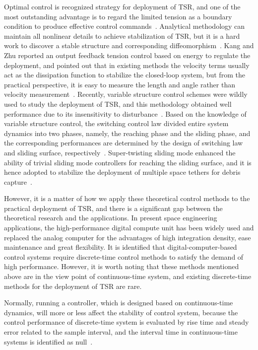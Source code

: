 \documentclass[10pt,final,journal]{IEEEtran}
\begin{document}
Optimal control  is recognized strategy for deployment of TSR, and one of the most outstanding advantage is to regard the limited tension as a boundary condition to produce effective control commands~\cite{williams2008deployment,wen2008optimal}. 
Analytical methodology can maintain all nonlinear details to achieve stabilization of TSR, but it is a hard work to discover a stable structure and corresponding diffeomorphism~\cite{yu2017analytical}. 
Kang and Zhu reported an output feedback tension control based on energy to regulate the deployment, and pointed out that in existing methods the velocity terms usually act as the dissipation function to stabilize the closed-loop system, but from the practical perspective, it is easy to measure the length and angle rather than velocity measurement~\cite{Kang2018}.
Recently, variable structure control schemes were wildly used to study the deployment of TSR, and this methodology obtained well performance due to its insensitivity to disturbance~\cite{zhang2017adaptive}. Based on the knowledge of variable structure control, the switching control law divided entire system dynamics into two phases, namely, the reaching phase and the sliding phase, and the corresponding performances are determined by the design of switching law and sliding surface,  respectively~\cite{ma2017dynamic,ma2018pure}. Super-twisting sliding mode enhanced the ability of trivial sliding mode controllers for reaching the sliding surface, and it is hence adopted to stabilize the deployment of multiple space tethers for debris capture~\cite{Zhang2017JGCD}.

However, it is a matter of how we apply these theoretical control methods to the practical deployment of TSR, and there is a significant gap between the theoretical research and the applications. In present space engineering applications, the high-performance digital compute unit has been widely used and replaced the analog computer for the advantages of high integration density, ease maintenance and great flexibility. It is identified that digital-computer-based control systems require discrete-time control methods to satisfy the demand of high performance. However, it is worth noting that these methods mentioned above are in the view point of continuous-time system, and existing discrete-time methods for the deployment of TSR are rare. 

Normally, running a controller, which is designed based on continuous-time dynamics, will more or less affect the stability of control system, because the control performance of discrete-time system is evaluated by rise time and steady error related to the sample interval, and the interval time in continuous-time systems is identified as null~\cite{sun2018discrete}.  
\end{document}
